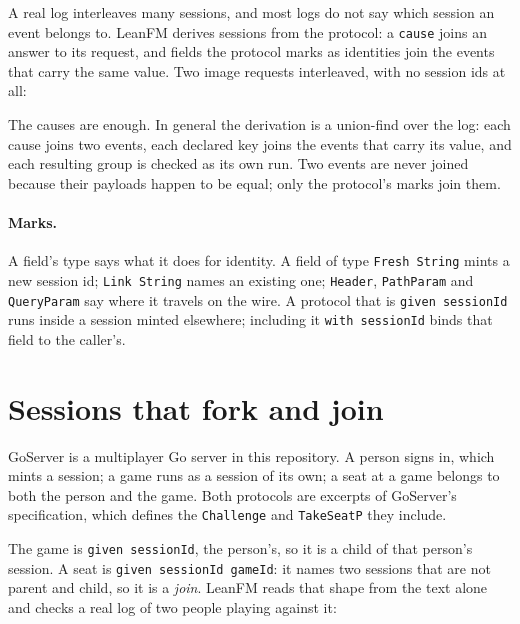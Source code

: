 A real log interleaves many sessions, and most logs do not say which session an event
belongs to. LeanFM derives sessions from the protocol: a \texttt{cause} joins an answer
to its request, and fields the protocol marks as identities join the events that carry
the same value. Two image requests interleaved, with no session ids at all:



The causes are enough. In general the derivation is a union-find over the log: each
cause joins two events, each declared key joins the events that carry its value, and
each resulting group is checked as its own run. Two events are never joined because
their payloads happen to be equal; only the protocol's marks join them.

\paragraph{Marks.} A field's type says what it does for identity. A field of type
\texttt{Fresh String} mints a new session id; \texttt{Link String} names an existing
one; \texttt{Header}, \texttt{PathParam} and \texttt{QueryParam} say where it travels
on the wire. A protocol that is \texttt{given sessionId} runs inside a session minted
elsewhere; including it \texttt{with sessionId} binds that field to the caller's.

\section{Sessions that fork and join}

GoServer is a multiplayer Go server in this repository. A person signs in, which mints
a session; a game runs as a session of its own; a seat at a game belongs to both the
person and the game. Both protocols are excerpts of GoServer's specification, which
defines the \texttt{Challenge} and \texttt{TakeSeatP} they include.




The game is \texttt{given sessionId}, the person's, so it is a child of that person's
session. A seat is \texttt{given sessionId gameId}: it names two sessions that are not
parent and child, so it is a \emph{join}. LeanFM reads that shape from the text alone
and checks a real log of two people playing against it:


